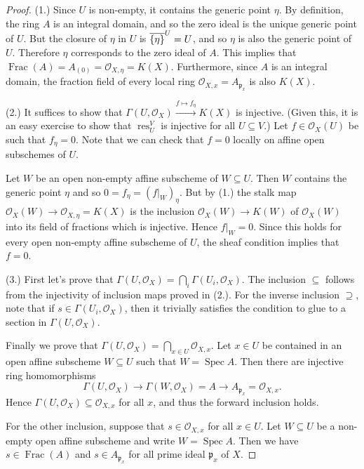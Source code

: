 \documentclass[12pt]{book}
\theoremstyle{definition}
\DeclareMathOperator\Frac{Frac}
\DeclarePairedDelimiter{\Set}{\lbrace}{\rbrace}
\newcommand{\res}{\operatorname{res}}
\DeclareMathOperator{\Spec}{Spec}
\begin{document}
	\begin{proof}
		(1.) Since $U$ is non-empty, it contains the generic point $\eta$. By definition, the ring $A$ is an integral domain, and so the zero ideal is the unique generic point of $U$. But the closure of $\eta$ in $U$ is $\overline{\Set{\eta}}^U = U$, and so $\eta$ is also the generic point of $U$. Therefore $\eta$ corresponds to the zero ideal of $A$. This implies that $\Frac(A) = A_{(0)} = \mathcal{O}_{X, \eta} = K(X)$. Furthermore, since $A$ is an integral domain, the fraction field of every local ring $\mathcal{O}_{X, x} = A_{\mathfrak{p}_x}$ is also $K(X)$.
		
		(2.) It suffices to show that $\Gamma(U, \mathcal{O}_X) \xrightarrow{f \mapsto f_\eta} K(X)$ is injective. (Given this, it is an easy exercise to show that $\res^V_U$ is injective for all $U \subseteq V$.) Let $f \in \mathcal{O}_X(U)$ be such that $f_\eta = 0$. Note that we can check that $f = 0$ locally on affine open subschemes of $U$.
		
		Let $W$ be an open non-empty affine subscheme of $W \subseteq U$. Then $W$ contains the generic point $\eta$ and so $0 = f_\eta = (f|_{W})_\eta$. But by (1.) the stalk map $\mathcal{O}_X(W) \to \mathcal{O}_{X, \eta} = K(X)$ is the inclusion $\mathcal{O}_X(W) \to K(W)$ of $\mathcal{O}_X(W)$ into its field of fractions which is injective. Hence $f|_{W} = 0$. Since this holds for every open non-empty affine subscheme of $U$, the sheaf condition implies that $f = 0$.
		
		(3.) First let's prove that $\Gamma(U, \mathcal{O}_X) = \bigcap_{i} \Gamma(U_i, \mathcal{O}_X)$. The inclusion $\subseteq$ follows from the injectivity of inclusion maps proved in (2.). For the inverse inclusion $\supseteq$, note that if $s \in\Gamma(U_i, \mathcal{O}_X)$, then it trivially satisfies the condition to glue to a section in $\Gamma(U, \mathcal{O}_X)$.
		
		Finally we prove that $\Gamma(U, \mathcal{O}_X) = \bigcap_{x \in U} \mathcal{O}_{X, x}$. Let $x \in U$ be contained in an open affine subscheme $W \subseteq U$ such that $W = \Spec A$. Then there are injective ring homomorphisms
		\begin{equation*}
			\Gamma(U, \mathcal{O}_X) \to \Gamma(W, \mathcal{O}_X) = A \to A_{\mathfrak{p}_x} = \mathcal{O}_{X, x}.
		\end{equation*}
		Hence $\Gamma(U, \mathcal{O}_X) \subseteq \mathcal{O}_{X, x}$ for all $x$, and thus the forward inclusion holds. 
		
		For the other inclusion, suppose that $s \in \mathcal{O}_{X, x}$ for all $x \in U$. Let $W \subseteq U$ be a non-empty open affine subscheme and write $W = \Spec A$. Then we have $s \in \Frac(A)$ and $s \in A_{\mathfrak{p}_x}$ for all prime ideal $\mathfrak{p}_x$ of $X$. 
		

\end{proof}
\end{document}
